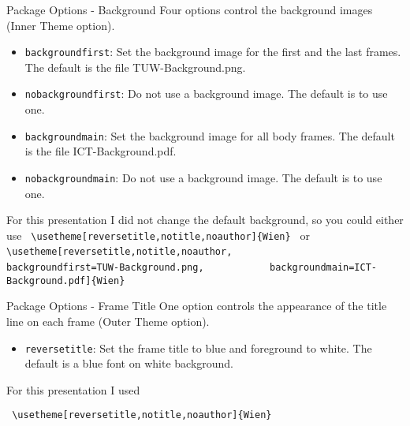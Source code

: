 \begin{frame}[fragile]{Package Options - Background}
   Four options control the background images (Inner Theme option).
  
\begin{itemize}
\item \texttt{backgroundfirst}: Set the background image for the first and the last frames. The default is the file TUW-Background.png.
\item \texttt{nobackgroundfirst}: Do not use a background image. The default is to use one.
\item \texttt{backgroundmain}: Set the background image for all body frames. The default is the file ICT-Background.pdf.
\item \texttt{nobackgroundmain}: Do not use a background image. The default is to use one.
\end{itemize}

For this presentation I did not change the default background, so you could either use
\verb| \usetheme[reversetitle,notitle,noauthor]{Wien} |
or
\verb| \usetheme[reversetitle,notitle,noauthor,|
\verb|           backgroundfirst=TUW-Background.png,|
\verb|           backgroundmain=ICT-Background.pdf]{Wien} |

\end{frame}
\begin{frame}[fragile]{Package Options - Frame Title}
   One option controls the appearance of the title line on each frame (Outer Theme option).
  
\begin{itemize}
\item \texttt{reversetitle}: Set the frame title to blue and
  foreground to white. The default is a blue font on white background.
\end{itemize}

For this presentation I used

\verb| \usetheme[reversetitle,notitle,noauthor]{Wien} |

\end{frame}
